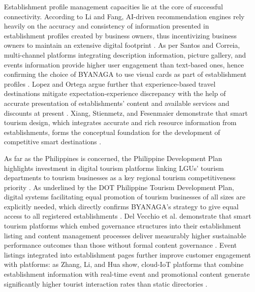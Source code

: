 \documentclass{research}
\begin{document}
Establishment profile management capacities lie at the core of successful connectivity. According to Li and Fang, AI-driven recommendation engines rely heavily on the accuracy and consistency of information presented in establishment profiles created by business owners, thus incentivizing business owners to maintain an extensive digital footprint \cite{li2024}. As per Santos and Correia, multi-channel platforms integrating description information, picture gallery, and events information provide higher user engagement than text-based ones, hence confirming the choice of BYANAGA to use visual cards as part of establishment profiles \cite{santos2023}. Lopez and Ortega argue further that experience-based travel destinations mitigate expectation-experience discrepancy with the help of accurate presentation of establishments' content and available services and discounts at present \cite{lopez2024}. Xiang, Stienmetz, and Fesenmaier demonstrate that smart tourism design, which integrates accurate and rich resource information from establishments, forms the conceptual foundation for the development of competitive smart destinations \cite{xiang2021}.

As far as the Philippines is concerned, the Philippine Development Plan highlights investment in digital tourism platforms linking LGUs' tourism departments to tourism businesses as a key regional tourism competitiveness priority \cite{neda2022}. As underlined by the DOT Philippine Tourism Development Plan, digital systems facilitating equal promotion of tourism businesses of all sizes are explicitly needed, which directly confirms BYANAGA's strategy to give equal access to all registered establishments \cite{dot2023}. Del Vecchio et al. demonstrate that smart tourism platforms which embed governance structures into their establishment listing and content management processes deliver measurably higher sustainable performance outcomes than those without formal content governance \cite{delvecchio2022}. Event listings integrated into establishment pages further improve customer engagement with platforms: as Zhang, Li, and Hua show, cloud-IoT platforms that combine establishment information with real-time event and promotional content generate significantly higher tourist interaction rates than static directories \cite{zhang2022cloud}.
\end{document}
